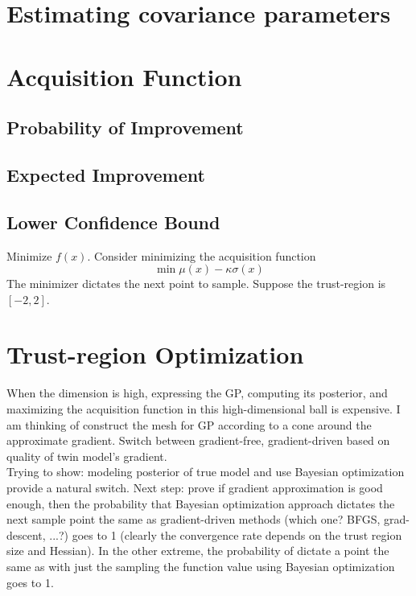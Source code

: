 \documentclass[a4paper,onecolumn]{article}
\theoremstyle{remark}
\begin{document}
\section{Estimating covariance parameters}
\section{Acquisition Function}
\subsection{Probability of Improvement}
\subsection{Expected Improvement}
\subsection{Lower Confidence Bound}
Minimize $f(x)$. Consider minimizing the acquisition function
\begin{equation}
    \min \mu(x) - \kappa \sigma(x)
\end{equation}
The minimizer dictates the next point to sample.
Suppose the trust-region is $[-2,2]$.\\


\section{Trust-region Optimization}
When the dimension is high, expressing the GP, computing its posterior, and maximizing the acquisition function 
in this high-dimensional ball is expensive.
I am thinking of construct the mesh for GP according to a cone around the approximate gradient.
Switch between gradient-free, gradient-driven based on quality of twin model's gradient.\\

\noindent
Trying to show: modeling posterior of true model and use Bayesian optimization provide a natural switch.
Next step: prove if gradient approximation is good enough, then the probability that Bayesian optimization approach
dictates the next sample point the same as gradient-driven methods (which one? BFGS, grad-descent, ...?) goes to 1 
(clearly the convergence rate depends on the trust region size and Hessian). In the other extreme, the probability
of dictate a point the same as with just the sampling the function value using Bayesian optimization goes to 1.
\end{document}
